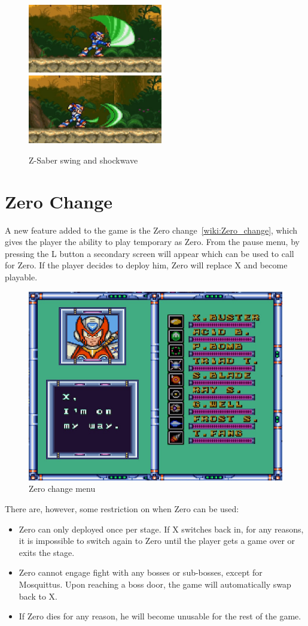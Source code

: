 \begin{figure}[htp] 
	\centering
	\includegraphics[height=3cm]{figures/X3/weapons/Z_saber_1.png}
	\includegraphics[height=3cm]{figures/X3/weapons/Z_saber_2.png}
	\caption{Z-Saber swing and shockwave}
\end{figure}

\section{Zero Change}\label{X3:Zero}
A new feature added to the game is the Zero change~\ref{wiki:Zero_change}, which gives the player the ability to play temporary as Zero. From the pause menu, by pressing the L button a secondary screen will appear which can be used to call for Zero. If the player decides to deploy him, Zero will replace X and become playable. 
\begin{figure}[htp] 
	\centering
	\includegraphics[width=.5\linewidth]{figures/X3/weapons/Zero_screen.png}
	\caption{Zero change menu}
\end{figure}
There are, however, some restriction on when Zero can be used:
\begin{itemize}
	\item Zero can only deployed once per stage. If X switches back in, for any reasons, it is impossible to switch again to Zero until the player gets a game over or exits the stage.
	\item Zero cannot engage fight with any bosses or sub-bosses, except for Mosquittus. Upon reaching a boss door, the game will automatically swap back to X.
	\item If Zero dies for any reason, he will become unusable for the rest of the game.
\end{itemize}

